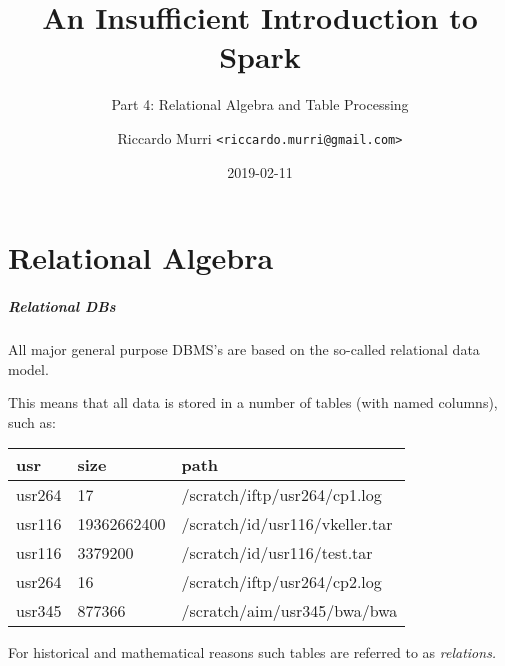 \documentclass[english,serif,mathserif]{beamer}
\begin{document}
\title[Spark]{An Insufficient Introduction to Spark}
\subtitle{Part 4: Relational Algebra and Table Processing}
\author{Riccardo Murri \texttt{<riccardo.murri@gmail.com>}}
\date{2019-02-11}

\maketitle

\part{Relational Algebra}

\begin{frame}
  \frametitle{\emph{Relational} DBs}

  All major general purpose DBMS's are based on the so-called relational
  data model.

  \+ This means that all data is stored in a number of tables (with named
  columns), such as:

  \begin{center}
    \small
    \begin{tabular}{lll}
      \textbf{usr}
             & \textbf{size}
                           & \textbf{path}                  \\
      \hline
      usr264 &          17 & /scratch/iftp/usr264/cp1.log   \\
      usr116 & 19362662400 & /scratch/id/usr116/vkeller.tar \\
      usr116 &     3379200 & /scratch/id/usr116/test.tar    \\
      usr264 &          16 & /scratch/iftp/usr264/cp2.log   \\
      usr345 &      877366 & /scratch/aim/usr345/bwa/bwa    \\
    \end{tabular}
  \end{center}

  For historical and mathematical reasons such tables are referred to as
  \emph{relations.}
\end{frame}
\end{document}
